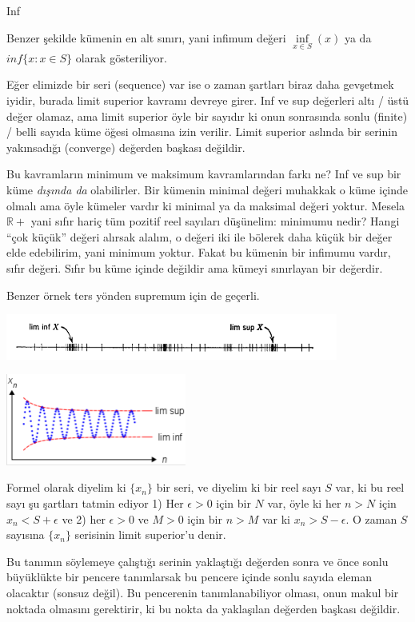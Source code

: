 \documentclass[12pt,fleqn]{article}\usepackage{../../common}
\begin{document}
Inf

Benzer şekilde kümenin en alt sınırı, yani infimum değeri $\inf\limits_{x \in
 S}(x)$ ya da $inf\{x:x \in S\}$ olarak gösteriliyor.

Eğer elimizde bir seri (sequence) var ise o zaman şartları biraz daha gevşetmek
iyidir, burada limit superior kavramı devreye girer. Inf ve sup değerleri altı /
üstü değer olamaz, ama limit superior öyle bir sayıdır ki onun sonrasında sonlu
(finite) / belli sayıda küme öğesi olmasına izin verilir. Limit superior aslında
bir serinin yakınsadığı (converge) değerden başkası değildir.

Bu kavramların minimum ve maksimum kavramlarından farkı ne? Inf ve sup bir küme
{\em dışında da} olabilirler. Bir kümenin minimal değeri muhakkak o küme içinde
olmalı ama öyle kümeler vardır ki minimal ya da maksimal değeri yoktur. Mesela
$\mathbb{R}+$ yani sıfır hariç tüm pozitif reel sayıları düşünelim: minimumu
nedir? Hangi ``çok küçük'' değeri alırsak alalım, o değeri iki ile bölerek daha
küçük bir değer elde edebilirim, yani minimum yoktur. Fakat bu kümenin bir
infimumu vardır, sıfır değeri. Sıfır bu küme içinde değildir ama kümeyi
sınırlayan bir değerdir.

Benzer örnek ters yönden supremum için de geçerli. 

\includegraphics[height=1.5cm]{2_1.png}

\includegraphics[height=3cm]{2_2.png}

Formel olarak diyelim ki $\{x_n\}$ bir seri, ve diyelim ki bir reel sayı $S$
var, ki bu reel sayı şu şartları tatmin ediyor 1) Her $\epsilon > 0$ için bir
$N$ var, öyle ki her $n>N$ için $x_n < S + \epsilon$ ve 2) her $\epsilon > 0$ ve
$M>0$ için bir $n>M$ var ki $x_n > S - \epsilon$. O zaman $S$ sayısına $\{x_n\}$
serisinin limit superior'u denir.

Bu tanımın söylemeye çalıştığı serinin yaklaştığı değerden sonra ve önce sonlu
büyüklükte bir pencere tanımlarsak bu pencere içinde sonlu sayıda eleman
olacaktır (sonsuz değil). Bu pencerenin tanımlanabiliyor olması, onun makul bir
noktada olmasını gerektirir, ki bu nokta da yaklaşılan değerden başkası
değildir.
\end{document}
